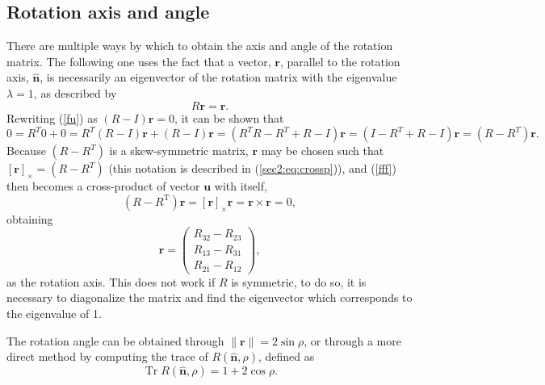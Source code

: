 \subsection{Rotation axis and angle}
There are multiple ways by which to obtain the axis and angle of the rotation matrix. The following one uses the fact that a vector, $\mathbf{r}$, parallel to the rotation axis, $\hat{\mathbf{n}}$, is necessarily an eigenvector of the rotation matrix with the eigenvalue $\lambda = 1$, as described by
\begin{equation}
\label{fu}
R \mathbf{r} = \mathbf{r}.
\end{equation}
Rewriting (\ref{fu}) as $( R - I ) \mathbf{r} = 0$, it can be shown that 
\begin{equation}
\label{fff}
0 = R ^ { T } 0 + 0 = R ^ { T } ( R - I ) \mathbf{r} + ( R - I ) \mathbf{r}  = \left( R ^ { T } R - R ^ { T } + R - I \right) \mathbf{r} = \left( I - R ^ { T } + R - I \right) \mathbf{r} = \left( R - R ^ { T } \right) \mathbf{r}.
\end{equation}
Because $(R - R^T)$ is a skew-symmetric matrix, $\mathbf{r}$ may be chosen such that $[ \mathbf{r} ] _ { \times} = \left( R - R ^ { T } \right)$ (this notation is described in (\ref{sec2:eq:crossp})), and (\ref{fff}) then becomes a cross-product of vector $\mathbf{u}$ with itself,
\begin{equation}
\left( R - R ^ { \mathrm { T } } \right) \mathbf{r} = [ \mathbf{r} ] _ { \times } \mathbf{r} = \mathbf{r} \times \mathbf{r} = 0,
\end{equation}
obtaining
\begin{equation}
\label{gggggg}
\mathbf{r} = \left( \begin{array} { c } { R _ { 32 } - R _ { 23 } } \\ { R _ { 13 } - R _ { 31 } } \\ { R _ { 21 } - R _ { 12 } } \end{array} \right),
\end{equation}
as the rotation axis. This does not work if $R$ is symmetric, to do so, it is necessary to diagonalize the matrix and find the eigenvector which corresponds to the eigenvalue of 1.

The rotation angle can be obtained through $\| \mathbf{r} \| = 2 \sin \rho$, or through a more direct method by computing the trace of $R(\hat{\mathbf{n}}, \rho)$, defined as
\begin{equation}
\operatorname { Tr } R ( \hat { \mathbf{n} } , \rho ) = 1 + 2 \cos \rho.
\end{equation}


